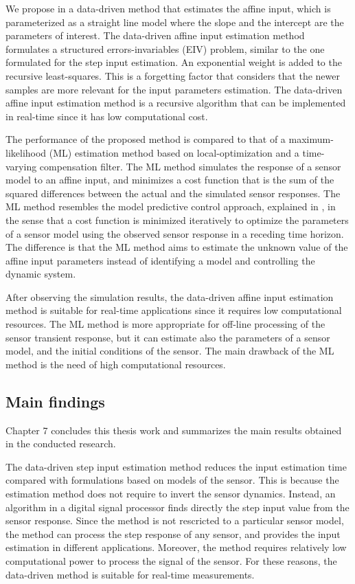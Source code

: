 We propose in \citet{QuintanaMEAS} a data-driven method that estimates the affine input,
which is parameterized as a straight line model where the slope and the intercept are the parameters of interest.
The data-driven affine input estimation method formulates a structured errors-invariables (EIV) problem, similar to the one formulated for the step input estimation.
An exponential weight is added to the recursive least-squares.
This is a forgetting factor that considers that the newer samples are more relevant for the input parameters estimation.
The data-driven affine input estimation method is a recursive algorithm that can be implemented in real-time since it has low computational cost.

The performance of the proposed method is compared to that of a maximum-likelihood (ML) estimation method based on local-optimization and a time-varying compensation filter.
The ML method simulates the response of a sensor model to an affine input, and minimizes a cost function that is the sum of the squared differences between the actual and the simulated sensor responses. 
The ML method resembles the model predictive control approach, explained in \citet{Mayne14}, in the sense that a cost function is minimized iteratively to optimize the parameters of a sensor model using the observed sensor response in a receding time horizon.
The difference is that the ML method aims to estimate the unknown value of the affine input parameters instead of identifying a model and controlling the dynamic system. 
 
After observing the simulation results, the data-driven affine input estimation method is suitable for real-time applications since it requires low computational resources. 
The ML method is more appropriate for off-line processing of the sensor transient response, but
it can estimate also the parameters of a sensor model, and the initial conditions of the sensor.
The main drawback of the ML method is the need of high computational resources.

\subsection{\color{blue}Main findings\color{black}}
\color{blue}Chapter 7 concludes this thesis work and summarizes the main results obtained in the conducted research. 

The data-driven step input estimation method reduces the input estimation time compared with formulations based on models of the sensor.
This is because the estimation method does not require to invert the sensor dynamics.
Instead, an algorithm in a digital signal processor finds directly the step input value from the sensor response.  
Since the method is not rescricted to a particular sensor model, the method can process the step response of any sensor, and provides the input estimation in different applications. 
Moreover, the method requires relatively low computational power to process the signal of the sensor.
For these reasons, the data-driven method is suitable for real-time measurements.

